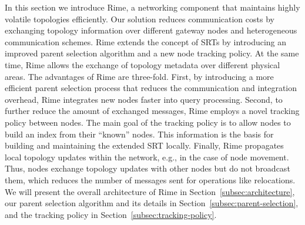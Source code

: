%
In this section we introduce Rime, a networking component that maintains highly volatile topologies efficiently. Our solution reduces communication costs by exchanging topology information over different gateway nodes and heterogeneous communication schemes.
Rime extends the concept of SRTs by introducing an improved parent selection algorithm and a new node tracking policy. At the same time, Rime allows the exchange of topology metadata over different physical areas.
% 
The advantages of Rime are three-fold.
First, by introducing a more efficient parent selection process that reduces the communication and integration overhead, Rime integrates new nodes faster into query processing.
%
Second, to further reduce the amount of exchanged messages, Rime employs a novel tracking policy between nodes. The main goal of the tracking policy is to allow nodes to build an index from their ``known'' nodes. This information is the basis for building and maintaining the extended SRT locally. 
%
Finally, Rime propagates local topology updates within the network, e.g., in the case of node movement. Thus, nodes exchange topology updates with other nodes but do not broadcast them, which reduces the number of messages sent for operations like relocations.
% 
% 
%
We will present the overall architecture of Rime in Section~\ref{subsec:architecture}, our parent selection algorithm and its details in Section~\ref{subsec:parent-selection}, and the tracking policy in Section~\ref{subsec:tracking-policy}.
%

